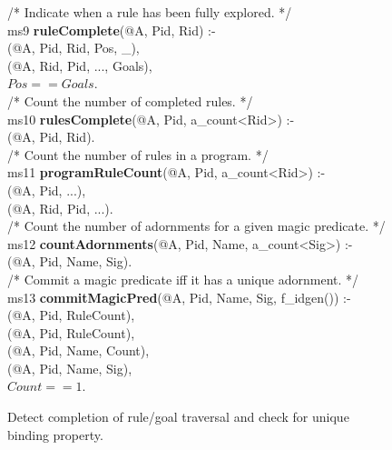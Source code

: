 \begin{figure}[!t]
\ssp
\centering
\begin{boxedminipage}{\linewidth}
/* Indicate when a rule has been fully explored. */ \\
ms9 {\bf ruleComplete}(@A, Pid, Rid) :- \\
(@A, Pid, Rid, Pos, \_), \\
(@A, Rid, Pid, ..., Goals), \\
\datalogspace $Pos == Goals$. \\
	       
/* Count the number of completed rules. */ \\
ms10 {\bf rulesComplete}(@A, Pid, a\_count<Rid>) :- \\
(@A, Pid, Rid). \\
	        
/* Count the number of rules in a program. */ \\
ms11 {\bf programRuleCount}(@A, Pid, a\_count<Rid>) :- \\
(@A, Pid, ...), \\
(@A, Rid, Pid, ...). \\
	
/* Count the number of adornments for a given magic predicate. */ \\
ms12 {\bf countAdornments}(@A, Pid, Name, a\_count<Sig>) :- \\
(@A, Pid, Name, Sig). \\
	       
/* Commit a magic predicate iff it has a unique adornment. */ \\
ms13 {\bf commitMagicPred}(@A, Pid, Name, Sig, f\_idgen()) :- \\
(@A, Pid, RuleCount), \\
(@A, Pid, RuleCount), \\
(@A, Pid, Name, Count), \\
(@A, Pid, Name, Sig), \\
\datalogspace $Count == 1$.
\end{boxedminipage}
\caption{\label{ch:magic:fig:magic4}Detect completion of rule/goal traversal and check for unique binding property.}
\end{figure}

